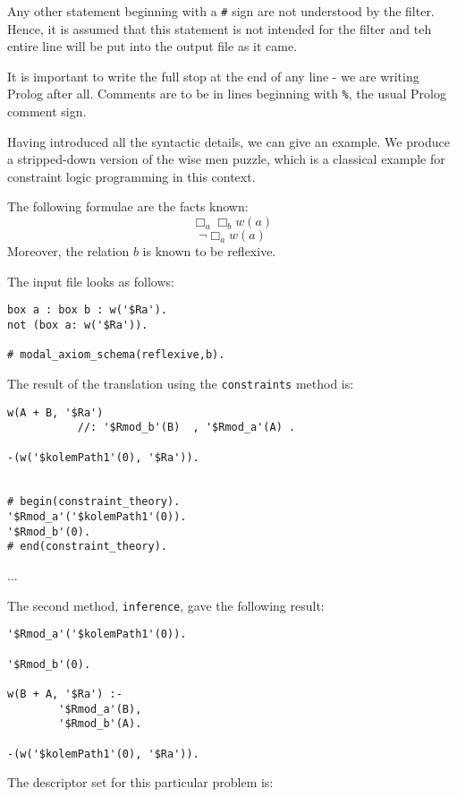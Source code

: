 Any other statement beginning with a {\tt \#} sign are not understood by the
filter. Hence, it is assumed that this statement is not intended for the
filter and teh entire line will be put into the output file as it came.

It is important to write the full stop at the end of any line - we are
writing Prolog after all. Comments are to be in lines beginning with
{\tt \%}, the usual Prolog comment sign.

Having introduced all the syntactic details, we can give an example. We
produce a stripped-down version of the wise men puzzle, which is a classical
example for constraint logic programming in this context.

The following formulae are the facts known:
      \[ \Box_a \Box_b w(a)\]
      \[ \neg \Box_a w(a)\]
Moreover, the relation \(b\) is known to be reflexive.

The input file looks as follows:

\begin{verbatim}
box a : box b : w('$Ra').
not (box a: w('$Ra')).

# modal_axiom_schema(reflexive,b).
\end{verbatim}

The result of the translation using the {\tt constraints} method is:

\begin{verbatim}
w(A + B, '$Ra')
           //: '$Rmod_b'(B)  , '$Rmod_a'(A) .

-(w('$kolemPath1'(0), '$Ra')).


# begin(constraint_theory).
'$Rmod_a'('$kolemPath1'(0)).
'$Rmod_b'(0).
# end(constraint_theory).
\end{verbatim}


...

The second method, {\tt inference}, gave the following result:

\begin{verbatim}
'$Rmod_a'('$kolemPath1'(0)).

'$Rmod_b'(0).

w(B + A, '$Ra') :-
        '$Rmod_a'(B),
        '$Rmod_b'(A).

-(w('$kolemPath1'(0), '$Ra')).
\end{verbatim}

The descriptor set for this particular problem is:

